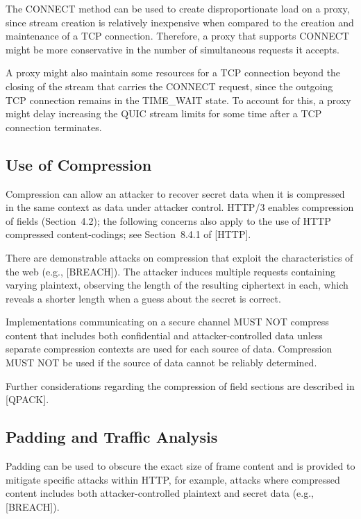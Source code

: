 \documentclass{article}
\begin{document}
The CONNECT method can be used to create disproportionate load on a proxy, since stream creation is relatively inexpensive when compared to the creation and maintenance of a TCP connection.  Therefore, a proxy that supports CONNECT might be more conservative in the number of simultaneous requests it accepts.

A proxy might also maintain some resources for a TCP connection beyond the closing of the stream that carries the CONNECT request, since the outgoing TCP connection remains in the TIME\_WAIT state.  To account for this, a proxy might delay increasing the QUIC stream limits for some time after a TCP connection terminates.

\subsection{Use of Compression}

Compression can allow an attacker to recover secret data when it is compressed in the same context as data under attacker control. HTTP/3 enables compression of fields (Section~4.2); the following concerns also apply to the use of HTTP compressed content-codings; see Section~8.4.1 of [HTTP].

There are demonstrable attacks on compression that exploit the characteristics of the web (e.g., [BREACH]).  The attacker induces multiple requests containing varying plaintext, observing the length of the resulting ciphertext in each, which reveals a shorter length when a guess about the secret is correct.

Implementations communicating on a secure channel MUST NOT compress content that includes both confidential and attacker-controlled data unless separate compression contexts are used for each source of data.  Compression MUST NOT be used if the source of data cannot be reliably determined.

Further considerations regarding the compression of field sections are described in [QPACK].

\subsection{Padding and Traffic Analysis}

Padding can be used to obscure the exact size of frame content and is provided to mitigate specific attacks within HTTP, for example, attacks where compressed content includes both attacker-controlled plaintext and secret data (e.g., [BREACH]).
\end{document}
